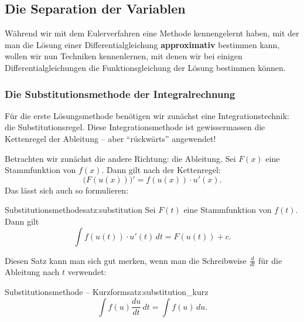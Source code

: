 























\clearpage
\subsection{Die Separation der Variablen}

Während wir mit dem Eulerverfahren eine Methode kennengelernt haben,
mit der man die Lösung einer Differentialgleichung \textbf{approximativ}
bestimmen kann, wollen wir nun Techniken kennenlernen, mit denen wir
bei einigen Differentialgleichungen die Funktionsgleichung der Lösung
bestimmen können.

\subsubsection{Die Substitutionsmethode der Integralrechnung}

Für die erste Lösungsmethode benötigen wir zunächst eine
Integrationstechnik: die Substitutionsregel.
Diese Integrationsmethode ist gewissermassen die Kettenregel
der Ableitung -- aber \enquote{rückwärts} angewendet!

Betrachten wir zunächst die andere Richtung: die Ableitung.
Sei \(F(x)\) eine Stammfunktion von \(f(x)\).
Dann gilt nach der Kettenregel:
\[
    \bigl(F(u(x))\bigr)'=f(u(x))\cdot u'(x).
\]
Das lässt sich auch so formulieren:

\begin{satz}{Substitutionsmethode}{satz:substitution}
    Sei \(F(t)\) eine Stammfunktion von \(f(t)\).
    Dann gilt
    \[
        \int f(u(t))\cdot u'(t)\,dt
        =F(u(t))+c.
    \]
\end{satz}

Diesen Satz kann man sich gut merken, wenn man die Schreibweise
\(\frac{d}{dt}\) für die Ableitung nach \(t\) verwendet:

\begin{satz}{Substitutionsmethode -- Kurzform}{satz:substitution_kurz}
    \[
        \int f(u)\frac{du}{dt}\,dt
        =\int f(u)\,du.
    \]
\end{satz}

